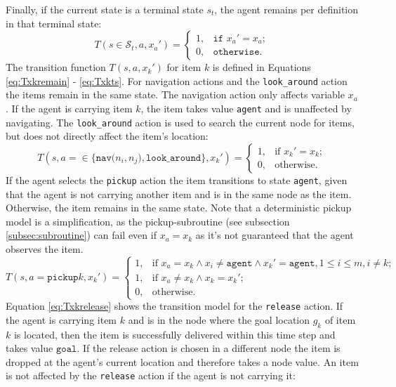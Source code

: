 Finally, if the current state is a terminal state $s_t$, the agent remains per definition in that terminal state:
\begin{equation}\label{eq:Tstxa}
    T(s\in\mathcal{S}_t, a, x_a') = \begin{cases}1, &\texttt{if }x_a'=x_a;\\
         0,& \texttt{otherwise}.\end{cases}
\end{equation}
The transition function $T(s, a, x_k')$ for item $k$ is defined in Equations \ref{eq:Txkremain} - \ref{eq:Txkts}. For navigation actions and the \texttt{look\_around} action the items remain in the same state. The navigation action only affects variable $x_a$. If the agent is carrying item $k$, the item takes value \texttt{agent} and is unaffected by navigating. The \texttt{look\_around} action is used to search the current node for items, but does not directly affect the item's location:    
\begin{equation}\label{eq:Txkremain}
    T(s, a=\in\{\texttt{nav($n_i, n_j$)},\texttt{look\_around}\}, x_k') = \begin{cases}
             1, & \text{if }x_k'=x_k;\\
             0, & \text{otherwise}.
         \end{cases}
\end{equation}
If the agent selects the \texttt{pickup} action the item transitions to state \texttt{agent}, given that the agent is not carrying another item and is in the same node as the item. Otherwise, the item remains in the same state. Note that a deterministic pickup model is a simplification, as the pickup-subroutine (see subsection \ref{subsec:subroutine}) can fail even if $x_a=x_k$ as it's not guaranteed that the agent observes the item.
\begin{equation}\label{eq:Txkpickup}
T(s,a=\texttt{pickup}k, x_k') = \begin{cases}
             1, & \text{if }x_a=x_k \land x_i\neq \texttt{agent} \land x_k'=\texttt{agent}, 1\leq i\leq m, i\neq k;  \\
             1, & \text{if }x_a \neq x_k \land x_k=x_k'; \\
             0, & \text{otherwise.}
         \end{cases}
\end{equation}
Equation \ref{eq:Txkrelease} shows the transition model for the \texttt{release} action. If the agent is carrying item $k$ and is in the node where the goal location $g_k$ of item $k$ is located, then the item is successfully delivered within this time step and takes value $\texttt{goal}$. If the release action is chosen in a different node the item is dropped at the agent's current location and therefore takes a node value. An item is not affected by the \texttt{release} action if the agent is not carrying it:
